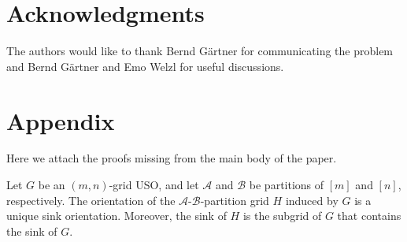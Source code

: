 \documentclass[runningheads,a4paper]{llncs}
\newcommand{\A}{\ensuremath{\mathcal A}}
\newcommand{\B}{\ensuremath{\mathcal B}}
\begin{document}
\section*{Acknowledgments}\label{sec:Acknowledgments}

The authors would like to thank Bernd G\"{a}rtner for communicating the problem and Bernd G\"{a}rtner and Emo Welzl for useful discussions.




\newpage
\appendix
\section*{Appendix}
Here we attach the proofs missing from the main body of the paper. 

\setcounter{lemma}{0}
\begin{lemma}
Let $G$ be an $(m,n)$-grid USO,
and let $\A$ and $\B$ be partitions of $[m]$ and $[n]$, respectively.
The orientation of the $\A$-$\B$-partition grid $H$ induced by $G$ is a unique sink orientation.
Moreover, the sink of $H$ is the subgrid of $G$ that contains the sink of $G$.
\end{lemma}
\end{document}
